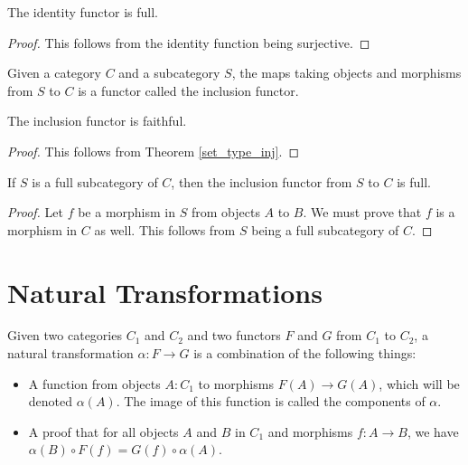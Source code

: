 \documentclass[../../math.tex]{subfiles}
\begin{document}
\begin{theorem}
    The identity functor is full.
\end{theorem}
\begin{proof}
    This follows from the identity function being surjective.
\end{proof}

\begin{definition}
    Given a category $C$ and a subcategory $S$, the maps taking objects and
    morphisms from $S$ to $C$ is a functor called the inclusion functor.
\end{definition}

\begin{theorem}
    The inclusion functor is faithful.
\end{theorem}
\begin{proof}
    This follows from Theorem \ref{set_type_inj}.
\end{proof}

\begin{theorem}
    If $S$ is a full subcategory of $C$, then the inclusion functor from $S$ to
    $C$ is full.
\end{theorem}
\begin{proof}
    Let $f$ be a morphism in $S$ from objects $A$ to $B$.  We must prove that
    $f$ is a morphism in $C$ as well.  This follows from $S$ being a full
    subcategory of $C$.
\end{proof}

\section{Natural Transformations}

\begin{definition}
    Given two categories $C_1$ and $C_2$ and two functors $F$ and $G$ from $C_1$
    to $C_2$, a natural transformation $\alpha : F \to G$ is a combination of
    the following things:
    \begin{itemize}
        \item A function from objects $A : C_1$ to morphisms $F(A) \to G(A)$,
            which will be denoted $\alpha(A)$.  The image of this function is
            called the components of $\alpha$.
        \item A proof that for all objects $A$ and $B$ in $C_1$ and morphisms $f
            : A \to B$, we have $\alpha(B) \circ F(f) = G(f) \circ \alpha(A)$.
    \end{itemize}
\end{definition}
\end{document}
